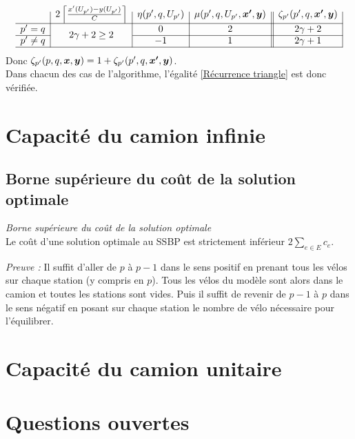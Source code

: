 \documentclass[twoside,11pt,openany,a4paper]{rapport}
\begin{document}
\begin{gather*}
  \begin{array}{c|c|c|c||c|}
    & 2 \left\lceil \frac{x'(U_{p'})-y(U_{p'})}{C} \right\rceil
    & \eta(p',q,U_{p'})
    & \mu(p',q,U_{p'},\bs{x'},\bs{y})
    & \zeta_{p'}(p',q,\bs{x'},\bs{y})
    \\ \hline
    p'=q
    & \multirow{2}{*}{$2 \gamma + 2 \ge 2$}
    & 0
    & 2
    & 2 \gamma + 2
    \\ \cline{1-1}\cline{3-5}
    p' \ne q
    &
    & -1
    & 1
    & 2\gamma + 1
    \\ \hline
  \end{array}
\end{gather*}
Donc $\zeta_{p'}(p,q,\boldsymbol{x},\boldsymbol{y}) = 1 + \zeta_{p'}(p',q,\boldsymbol{x'},\boldsymbol{y})$.
\\

Dans chacun des cas de l'algorithme, l'égalité \ref{Récurrence triangle} est donc vérifiée.

\chapter{Capacité du camion infinie}

\section{Borne supérieure du coût de la solution optimale}

\begin{lem}\emph{Borne supérieure du coût de la solution optimale}\\
Le coût d'une solution optimale au SSBP est strictement inférieur $\displaystyle 2\sum_{e \in E}c_e$.
\end{lem}

\textit{Preuve :} Il suffit d'aller de $p$ à $p-1$ dans le sens positif en prenant tous les vélos sur chaque station (y compris en $p$). Tous les vélos du modèle sont alors dans le camion et toutes les stations sont vides. Puis il suffit de revenir de $p-1$ à $p$ dans le sens négatif en posant sur chaque station le nombre de vélo nécessaire pour l'équilibrer.

\chapter{Capacité du camion unitaire}

\chapter{Questions ouvertes}
\end{document}
